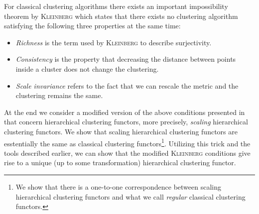 For classical clustering algorithms there exists an important impossibility theorem by \textsc{Kleinberg} \cite{Kleinberg2002} which states that there exists no clustering algorithm satisfying the following three properties at the same time:

\begin{itemize}
    \item \emph{Richness} is the term used by \textsc{Kleinberg} to describe surjectivity.
    \item  \emph{Consistency} is the property that decreasing the distance between points inside a cluster does not change the clustering.
    \item \emph{Scale invariance} refers to the fact that we can rescale the metric and the clustering remains the same.
\end{itemize}

At the end we consider a modified version of the above conditions presented in \cite[Sec.~7.3.1]{Carlsson2010} that concern hierarchical clustering functors, more precisely, \emph{scaling} hierarchical clustering functors. We show that scaling hierarchical clustering functors are esstentially the same as classical clustering functors\footnote{We show that there is a one-to-one correspondence between scaling hierarchical clustering functors and what we call \emph{regular} classical clustering functors.}. Utilizing this trick and the tools described earlier, we can show that the modified \textsc{Kleinberg} conditions give rise to a unique (up to some transformation) hierarchical clustering functor.




